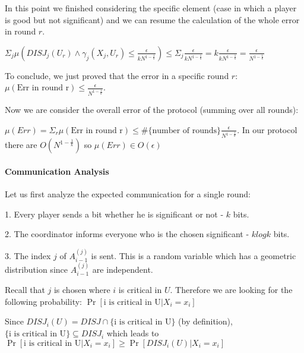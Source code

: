 \documentclass{article}
\theoremstyle{plain}
\begin{document}
In this point we finished considering the specific element (case in which a player is good but not significant) and we can resume the calculation of the whole error in round $r$.  \newline

$\Sigma_j \mu(DISJ_j(U_r) \land \gamma_j(X_j, U_r) \leq \frac{\epsilon}{kN^{1-\frac{1}{k}}}) \leq \Sigma_j \frac{\epsilon}{kN^{1-\frac{1}{k}}} = k\frac{\epsilon}{kN^{1-\frac{1}{k}}} = \frac{\epsilon}{N^{1-\frac{1}{k}}}$
\newline

To conclude, we just proved that the error in a specific round $r$:
$\mu(\text{Err in round r}) \leq \frac{\epsilon}{N^{1-\frac{1}{k}}}$.\newline

Now we are consider the overall error of the protocol (summing over all rounds):

$\mu(Err) = \Sigma_{r} \mu(\text{Err in round r}) \leq \#\{\text{number of rounds}\} \frac{\epsilon}{N^{1-\frac{1}{k}}}$. \newline
In our protocol there are $O(N^{1-\frac{1}{k}})$ so
$\mu(Err) \in O(\epsilon)$

\paragraph{Communication Analysis}
Let us first analyze the expected communication for a single round: \newline

1. Every player sends a bit whether he is significant or not - $k$ bits.\newline

2. The coordinator informs everyone who is the chosen significant - $klogk$ bits. \newline

3. The index $j$ of $A_{i-1}^{(j)}$ is sent. \newline
This is a random variable which has a geometric distribution since $A_{i-1}^{(j)}$ are independent. \newline

Recall that $j$ is chosen where $i$ is critical in $U$. \newline
Therefore we are looking for the following probability:
$\Pr[\text{i is critical in U}| X_i = x_i]$ \newline

Since $DISJ_i(U) = DISJ \cap \{\text{i is critical in U}\}$ (by definition), $\{\text{i is critical in U}\} \subseteq DISJ_i$ which leads to \newline
$\Pr[\text{i is critical in U}| X_i = x_i] \geq \Pr[DISJ_i(U) | X_i = x_i]$ \newline
\end{document}
